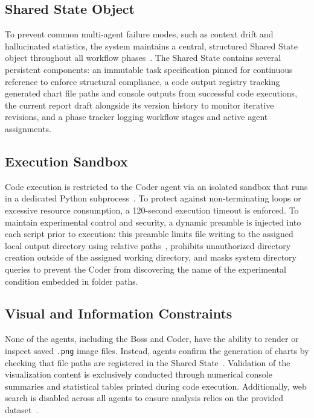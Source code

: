 \subsection{Shared State Object}
\label{subsec:shared-state-object}

To prevent common multi-agent failure modes, such as context drift and hallucinated statistics, the system maintains a central, structured Shared State object throughout all workflow phases~\cite{qian2024chatdevcommunicativeagentssoftware, yehudai2026surveyevaluationllmbasedagents}.
The Shared State contains several persistent components:
an immutable task specification pinned for continuous reference to enforce structural compliance, 
a code output registry tracking generated chart file paths and console outputs from successful code executions, 
the current report draft alongside its version history to monitor iterative revisions, 
and a phase tracker logging workflow stages and active agent assignments.

\subsection{Execution Sandbox}
\label{subsec:execution-sandbox}

Code execution is restricted to the Coder agent via an isolated sandbox that runs in a dedicated Python subprocess~\cite{yehudai2026surveyevaluationllmbasedagents}.
To protect against non-terminating loops or excessive resource consumption, a 120-second execution timeout is enforced.
To maintain experimental control and security, a dynamic preamble is injected into each script prior to execution:
this preamble limits file writing to the assigned local output directory using relative paths~\cite{qian2024chatdevcommunicativeagentssoftware, wu2023autogenenablingnextgenllm},
prohibits unauthorized directory creation outside of the assigned working directory,
and masks system directory queries to prevent the Coder from discovering the name of the experimental condition embedded in folder paths.

\subsection{Visual and Information Constraints}
\label{subsec:visual-information-constraints}

None of the agents, including the Boss and Coder, have the ability to render or inspect saved \texttt{.png} image files.
Instead, agents confirm the generation of charts by checking that file paths are registered in the Shared State~\cite{yehudai2026surveyevaluationllmbasedagents}.
Validation of the visualization content is exclusively conducted through numerical console summaries and statistical tables printed during code execution.
Additionally, web search is disabled across all agents to ensure analysis relies on the provided dataset~\cite{yehudai2026surveyevaluationllmbasedagents}.

